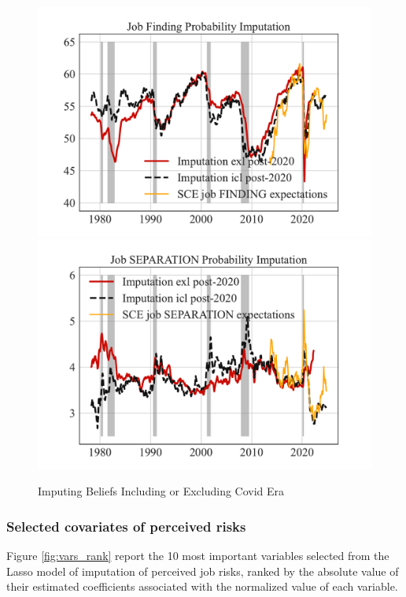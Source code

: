 \begin{figure}[pt]
    \centering
    \caption{Imputing Beliefs Including or Excluding Covid Era}\label{fig:imputed_JF_comparison_covid}
\includegraphics[width=0.7\linewidth]{text/Chapter2/Figures/imputed_JF_comparison_covid.pdf} 
\includegraphics[width=0.7\linewidth]{text/Chapter2/Figures/imputed_JS_comparison_covid.pdf} 
\end{figure}

\subsubsection{Selected covariates of perceived risks}
\label{appendix: covariates_perceived_risks}

Figure \ref{fig:vars_rank} report the 10 most important variables selected from the Lasso model of imputation of perceived job risks, ranked by the absolute value of their estimated coefficients associated with the normalized value of each variable.  

